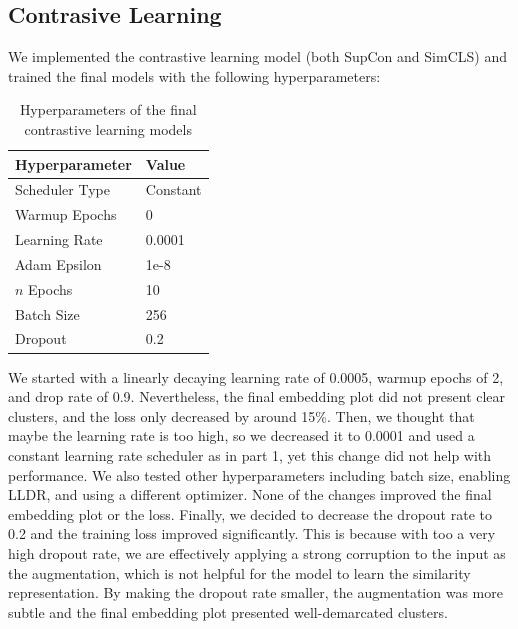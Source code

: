 \documentclass{article}
\begin{document}
    \subsection{Contrasive Learning}
    We implemented the contrastive learning model (both SupCon and SimCLS) and trained the final models with the following hyperparameters:

    \begin{table}[H]
        \centering
        \begin{tabular}{ll}
            \toprule
            \textbf{Hyperparameter} & \textbf{Value} \\
            \midrule
            Scheduler Type          & Constant       \\
            Warmup Epochs           & 0              \\
            Learning Rate           & 0.0001         \\
            Adam Epsilon            & 1e-8           \\
            $n$ Epochs              & 10             \\
            Batch Size              & 256            \\
            Dropout                 & 0.2            \\
            \bottomrule
        \end{tabular}
        \caption{Hyperparameters of the final contrastive learning models}
        \label{tab:hyps_contrastive}
    \end{table}

    We started with a linearly decaying learning rate of 0.0005, warmup epochs of 2, and drop rate of 0.9.
    Nevertheless, the final embedding plot did not present clear clusters, and the loss only decreased by around 15\%.
    Then, we thought that maybe the learning rate is too high, so we decreased it to 0.0001 and used a constant learning rate
    scheduler as in part 1, yet this change did not help with performance.
    We also tested other hyperparameters including batch size, enabling LLDR, and using a different optimizer.
    None of the changes
    improved the final embedding plot or the loss.
    Finally, we decided to decrease the dropout rate to 0.2 and the training loss improved significantly.
    This is because with too a very high dropout rate, we are effectively applying a strong corruption to the input as the
    augmentation, which is not helpful for the model to learn the similarity representation.
    By making the dropout rate smaller, the augmentation was more subtle and the final embedding plot presented well-demarcated
    clusters.
\end{document}
